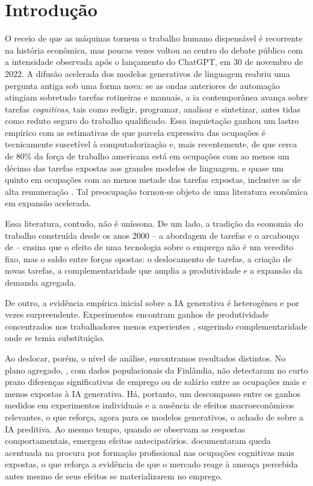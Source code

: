 \chapter{Introdução}\label{cap:intro}


O receio de que as máquinas tornem o trabalho humano dispensável é recorrente na história econômica, mas poucas vezes voltou ao centro do debate público com a intensidade observada após o lançamento do ChatGPT, em 30 de novembro de 2022. A difusão acelerada dos modelos generativos de linguagem reabriu uma pergunta antiga sob uma forma nova: se as ondas anteriores de automação atingiam sobretudo tarefas rotineiras e manuais, a \gls{ia} contemporânea avança sobre tarefas \emph{cognitivas}, tais como redigir, programar, analisar e sintetizar, antes tidas como reduto seguro do trabalho qualificado. Essa inquietação ganhou um lastro empírico com as estimativas de que parcela expressiva das ocupações é tecnicamente suscetível à computadorização \parencite{frey2017} e, mais recentemente, de que cerca de 80\% da força de trabalho americana está em ocupações com ao menos um décimo das tarefas expostas aos grandes modelos de linguagem, e quase um quinto em ocupações com ao menos metade das tarefas expostas, inclusive as de alta remuneração \parencite{eloundou2024}. Tal preocupação tornou-se objeto de uma literatura econômica em expansão acelerada.

Essa literatura, contudo, não é uníssona. De um lado, a tradição da economia do trabalho construída desde os anos 2000 -- a abordagem de tarefas e o arcabouço de \textcite{acemogluRestrepo2019} -- ensina que o efeito de uma tecnologia sobre o emprego não é um veredito fixo, mas o saldo entre forças opostas: o deslocamento de tarefas, a criação de novas tarefas, a complementaridade que amplia a produtividade e a expansão da demanda agregada.

De outro, a evidência empírica inicial sobre a IA generativa é heterogênea e por vezes surpreendente. Experimentos encontram ganhos de produtividade concentrados nos trabalhadores menos experientes \parencite{noyZhang2023, brynjolfssonLiRaymond2025}, sugerindo complementaridade onde se temia substituição.

Ao deslocar, porém, o nível de análise, encontramos resultados distintos. No plano agregado, \textcite{kauhanenRouvinen2025}, com dados populacionais da Finlândia, não detectaram no curto prazo diferenças significativas de emprego ou de salário entre as ocupações mais e menos expostas à IA generativa.  Há, portanto, um descompasso entre os ganhos medidos em experimentos individuais e a ausência de efeitos macroeconômicos relevantes, o que reforça, agora para os modelos generativos, o achado de \textcite{acemogluVacancies2022} sobre a IA preditiva. Ao mesmo tempo, quando se observam as respostas comportamentais, emergem efeitos antecipatórios. \textcite{gollerGschwendtWolter2025} documentaram queda acentuada na procura por formação profissional nas ocupações cognitivas mais expostas, o que reforça a evidência de que o mercado reage à ameaça percebida antes mesmo de seus efeitos se materializarem no emprego.

